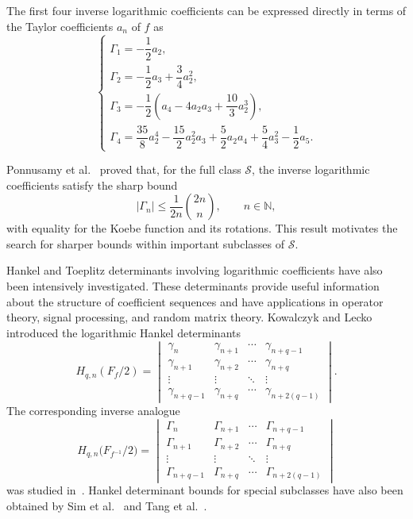 \documentclass[10pt,a4paper]{amsart}
\numberwithin{equation}{section}
\begin{document}
The first four inverse logarithmic coefficients can be expressed directly in terms of the Taylor coefficients $a_n$ of $f$ as
\begin{equation}\label{IG1}
\begin{cases}
\Gamma_1=-\dfrac{1}{2}a_2,\\[8pt]
\Gamma_2=-\dfrac{1}{2}a_3+\dfrac{3}{4}a_2^2,\\[8pt]
\Gamma_3=-\dfrac{1}{2}\left(a_4-4a_2a_3+\dfrac{10}{3}a_2^3\right),\\[8pt]
\Gamma_4=\dfrac{35}{8}a_2^4-\dfrac{15}{2}a_2^2a_3+\dfrac{5}{2}a_2a_4+\dfrac{5}{4}a_3^2-\dfrac{1}{2}a_5.
\end{cases}
\end{equation}

Ponnusamy et al.\ \cite{Ponnusamy2018} proved that, for the full class $\mathcal{S}$, the inverse logarithmic coefficients satisfy the sharp bound
\[
|\Gamma_n|
\le
\frac{1}{2n}\binom{2n}{n},\qquad n\in\mathbb{N},
\]
with equality for the Koebe function and its rotations. This result motivates the search for sharper bounds within important subclasses of $\mathcal{S}$.

Hankel and Toeplitz determinants involving logarithmic coefficients have also been intensively investigated. These determinants provide useful information about the structure of coefficient sequences and have applications in operator theory, signal processing, and random matrix theory. Kowalczyk and Lecko~\cite{12,15} introduced the logarithmic Hankel determinants
\[
H_{q,n}\left(F_f/2\right)
=
\begin{vmatrix}
\gamma_n & \gamma_{n+1} & \cdots & \gamma_{n+q-1}\\
\gamma_{n+1} & \gamma_{n+2} & \cdots & \gamma_{n+q}\\
\vdots & \vdots & \ddots & \vdots\\
\gamma_{n+q-1} & \gamma_{n+q} & \cdots & \gamma_{n+2(q-1)}
\end{vmatrix}.
\]
The corresponding inverse analogue
\[
H_{q,n}\bigl(F_{f^{-1}}/2\bigr)
=
\begin{vmatrix}
\Gamma_n & \Gamma_{n+1} & \cdots & \Gamma_{n+q-1}\\
\Gamma_{n+1} & \Gamma_{n+2} & \cdots & \Gamma_{n+q}\\
\vdots & \vdots & \ddots & \vdots\\
\Gamma_{n+q-1} & \Gamma_{n+q} & \cdots & \Gamma_{n+2(q-1)}
\end{vmatrix}
\]
was studied in~\cite{10,16}. Hankel determinant bounds for special subclasses have also been obtained by Sim et al.\ \cite{STZ} and Tang et al.\ \cite{TAA,TAH}.
\end{document}
